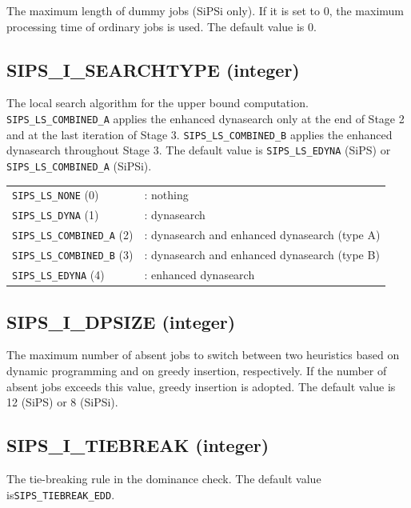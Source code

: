 \documentclass[a4paper]{book}
\begin{document}
The maximum length of dummy jobs (SiPSi only).
If it is set to 0, the maximum processing time of ordinary jobs is used.
The default value is 0.

\hypertarget{SEARCHTYPE}{%
\subsection{SIPS\_I\_SEARCHTYPE (integer)}
}

The local search algorithm for the upper bound computation.
\verb+SIPS_LS_COMBINED_A+ applies the enhanced dynasearch only at the end of Stage 2 and at the last iteration of Stage 3.
\verb+SIPS_LS_COMBINED_B+ applies the enhanced dynasearch throughout Stage 3.
The default value is \verb+SIPS_LS_EDYNA+ (SiPS) or \verb+SIPS_LS_COMBINED_A+ (SiPSi).

\medskip

\begin{tabular}{l@{~}l}
  \verb+SIPS_LS_NONE+       (0) &: nothing\\
  \verb+SIPS_LS_DYNA+       (1) &: dynasearch\\
  \verb+SIPS_LS_COMBINED_A+ (2) &: dynasearch and enhanced dynasearch (type A)\\
  \verb+SIPS_LS_COMBINED_B+ (3) &: dynasearch and enhanced dynasearch (type B)\\
  \verb+SIPS_LS_EDYNA+      (4) &: enhanced dynasearch\\
\end{tabular}

\hypertarget{DPSIZE}{%
\subsection{SIPS\_I\_DPSIZE (integer)}
}

The maximum number of absent jobs to switch between two heuristics based on dynamic programming and on greedy insertion, respectively.
If the number of absent jobs exceeds this value, greedy insertion is adopted.
The default value is 12 (SiPS) or 8 (SiPSi).

\hypertarget{TIEBREAK}{%
\subsection{SIPS\_I\_TIEBREAK (integer)}
}

The tie-breaking rule in the dominance check.
The default value is\linebreak \verb+SIPS_TIEBREAK_EDD+.

\medskip
\end{document}
